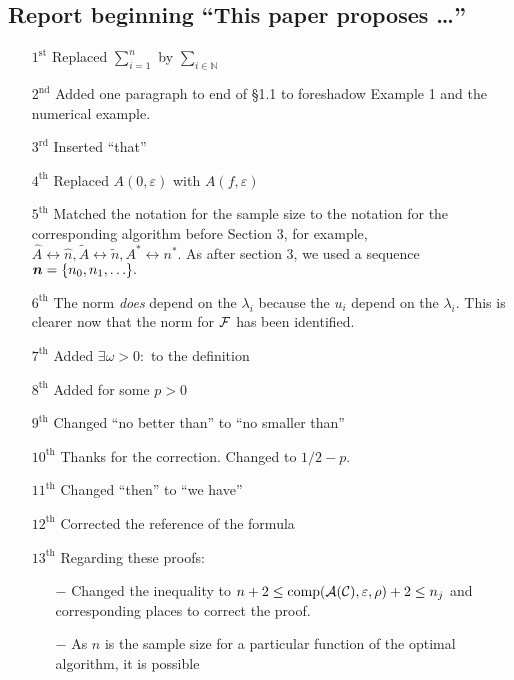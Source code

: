 \documentclass[letter]{article}
\begin{document}
\subsection*{Report beginning ``This paper proposes \ldots''}

\begin{enumerate}[labelwidth = 10ex]
    \item[$1^{\text{st}}$ \bullet] Replaced
    $\sum\limits_{i =1 }^n$ by $\sum\limits_{i \in \mathbb{N} }$
    \item[$2^{\text{nd}}$ \bullet] Added one paragraph to end of \S 1.1 to foreshadow Example 1 and the numerical example.
    \item[$3^{\text{rd}}$ \bullet] Inserted ``that''
    \item[$4^{\text{th}}$ \bullet] Replaced $A(0,\varepsilon)$ 
    with $A(f,\varepsilon)$
    \item[$5^{\text{th}}$ \bullet] Matched the notation for the sample size to the notation for the corresponding algorithm before Section 3,  for example,
    $\widehat{A} \leftrightarrow \widehat{n}, \widetilde{A} \leftrightarrow \widetilde{n},
    A^* \leftrightarrow n^*$. As after section 3, we used a sequence ${\boldsymbol{n}} = \{n_0, n_1, \ldots \}.$ 
     \item[$6^{\text{th}}$ \bullet] The norm \emph{does} depend on the $\lambda_i$ because the $u_i$ depend on the $\lambda_i$.  This is clearer now that the norm for ${\mathcal{F}}$ has been identified.
    \item[$7^{\text{th}}$ \bullet] Added $\exists \omega >0:$ to the definition
    \item[$8^{\text{th}}$ \bullet] Added for some $p>0$
    \item[$9^{\text{th}}$ \bullet] Changed ``no better than'' to ``no smaller than''
    \item[$10^{\text{th}}$ \bullet] Thanks for the correction. Changed to $1/2 -p$.
     \item[$11^{\text{th}}$ \bullet] Changed ``then'' to ``we have''
      \item[$12^{\text{th}}$ \bullet] Corrected the reference of the formula
      \item[$13^{\text{th}}$ \bullet] Regarding these proofs:
       \begin{itemize}
       \item[$-$] Changed the inequality to 
      $n + 2\le \textup{comp}({\mathcal{A}}({\mathcal{C}}),\varepsilon,\rho) + 2 \le n_j$ and corresponding places to correct the proof.
      \item[$-$] As $n$ is the sample size for a particular function of the optimal algorithm, it is possible 

\end{itemize}
\end{enumerate}
\end{document}
